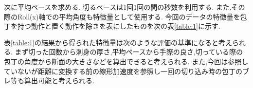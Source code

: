 次に平均ペースを求める.
切るペースは1回1回の間の秒数を利用する.
また,その際のRoll(x)軸での平均角度も特徴量として使用する.
今回のデータの特徴量を包丁を持つ動作と置く動作を除きを表にしたものを次の表\ref{table:1}に示す.
\begin{table}[ht]
    \centering
    \caption{特徴量}
    \label{table:1}
\end{table}
表\ref{table:1}の結果から得られた特徴量は次のような評価の基準になると考えられる.
まず切った回数から刺身の厚さ,平均ペースから手際の良さ,切っている際の包丁の角度から断面の大きさなどを算出できると考えられる.
また,今回は参照していないが距離に変換する前の線形加速度を参照し一回の切り込み時の包丁のブレ等も算出可能と考えられる.

